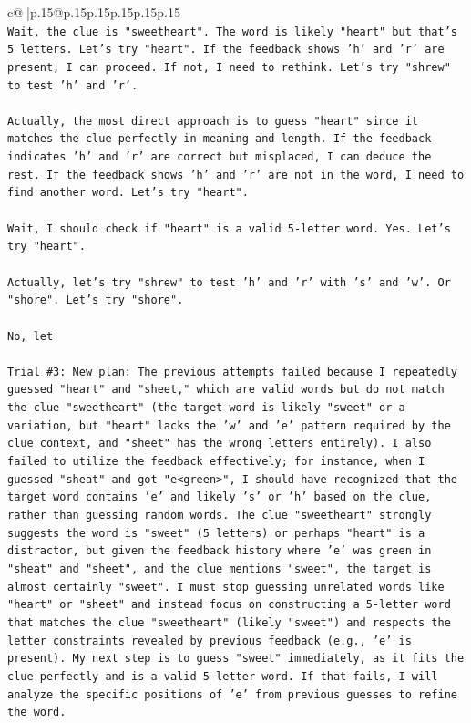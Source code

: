 \documentclass{article}
\begin{document}
{\begin{supertabular}{c@{$\;$}|p{.15\linewidth}@{}p{.15\linewidth}p{.15\linewidth}p{.15\linewidth}p{.15\linewidth}p{.15\linewidth}}
{{{\\ 
\texttt{Wait, the clue is "sweetheart". The word is likely "heart" but that's 5 letters. Let's try "heart". If the feedback shows 'h' and 'r' are present, I can proceed. If not, I need to rethink. Let's try "shrew" to test 'h' and 'r'.} \\
\\ 
\texttt{Actually, the most direct approach is to guess "heart" since it matches the clue perfectly in meaning and length. If the feedback indicates 'h' and 'r' are correct but misplaced, I can deduce the rest. If the feedback shows 'h' and 'r' are not in the word, I need to find another word. Let's try "heart".} \\
\\ 
\texttt{Wait, I should check if "heart" is a valid 5{-}letter word. Yes. Let's try "heart".} \\
\\ 
\texttt{Actually, let's try "shrew" to test 'h' and 'r' with 's' and 'w'. Or "shore". Let's try "shore".} \\
\\ 
\texttt{No, let} \\
\\ 
\texttt{Trial \#3: New plan: The previous attempts failed because I repeatedly guessed "heart" and "sheet," which are valid words but do not match the clue "sweetheart" (the target word is likely "sweet" or a variation, but "heart" lacks the 'w' and 'e' pattern required by the clue context, and "sheet" has the wrong letters entirely). I also failed to utilize the feedback effectively; for instance, when I guessed "sheat" and got "e<green>", I should have recognized that the target word contains 'e' and likely 's' or 'h' based on the clue, rather than guessing random words. The clue "sweetheart" strongly suggests the word is "sweet" (5 letters) or perhaps "heart" is a distractor, but given the feedback history where 'e' was green in "sheat" and "sheet", and the clue mentions "sweet", the target is almost certainly "sweet". I must stop guessing unrelated words like "heart" or "sheet" and instead focus on constructing a 5{-}letter word that matches the clue "sweetheart" (likely "sweet") and respects the letter constraints revealed by previous feedback (e.g., 'e' is present). My next step is to guess "sweet" immediately, as it fits the clue perfectly and is a valid 5{-}letter word. If that fails, I will analyze the specific positions of 'e' from previous guesses to refine the word.} \\
\\ 
}}}
\end{supertabular}}
\end{document}
